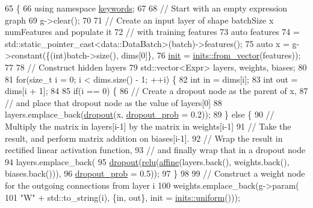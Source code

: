 \begin{DoxyCode}
65                                                      \{
66     \textcolor{keyword}{using namespace }\hyperlink{namespacekeywords}{keywords};
67 
68     \textcolor{comment}{// Start with an empty expression graph}
69     g->clear();
70 
71     \textcolor{comment}{// Create an input layer of shape batchSize x numFeatures and populate it}
72     \textcolor{comment}{// with training features}
73     \textcolor{keyword}{auto} features
74         = std::static\_pointer\_cast<data::DataBatch>(batch)->features();
75     \textcolor{keyword}{auto} x = g->constant(\{(int)batch->size(), dims[0]\},
76                          \hyperlink{amunmt_8cpp_a2e8ddb8bd2f3405f554c9f2c52277f4b}{init} = \hyperlink{namespacemarian_1_1inits_ab9566318ddbacd376c74cdbdfac091e4}{inits::from\_vector}(features));
77 
78     \textcolor{comment}{// Construct hidden layers}
79     std::vector<Expr> layers, weights, biases;
80 
81     \textcolor{keywordflow}{for}(\textcolor{keywordtype}{size\_t} i = 0; i < dims.size() - 1; ++i) \{
82       \textcolor{keywordtype}{int} in = dims[i];
83       \textcolor{keywordtype}{int} out = dims[i + 1];
84 
85       \textcolor{keywordflow}{if}(i == 0) \{
86         \textcolor{comment}{// Create a dropout node as the parent of x,}
87         \textcolor{comment}{//   and place that dropout node as the value of layers[0]}
88         layers.emplace\_back(\hyperlink{namespacemarian_a268400392f22176821c7c4a36733b178}{dropout}(x, \hyperlink{namespacemarian_1_1keywords_aeb1a41f81a79487b23aa2f8769a205bf}{dropout\_prob} = 0.2));
89       \} \textcolor{keywordflow}{else} \{
90         \textcolor{comment}{// Multiply the matrix in layers[i-1] by the matrix in weights[i-1]}
91         \textcolor{comment}{// Take the result, and perform matrix addition on biases[i-1].}
92         \textcolor{comment}{// Wrap the result in rectified linear activation function,}
93         \textcolor{comment}{// and finally wrap that in a dropout node}
94         layers.emplace\_back(
95             \hyperlink{namespacemarian_a268400392f22176821c7c4a36733b178}{dropout}(\hyperlink{namespacemarian_a6228f7e46aeed337e3886df6446b7840}{relu}(\hyperlink{namespacemarian_aefe65d738dc9a0536f3a1f9346b8d47b}{affine}(layers.back(), weights.back(), biases.back())),
96                     \hyperlink{namespacemarian_1_1keywords_aeb1a41f81a79487b23aa2f8769a205bf}{dropout\_prob} = 0.5));
97       \}
98 
99       \textcolor{comment}{// Construct a weight node for the outgoing connections from layer i}
100       weights.emplace\_back(g->param(
101           \textcolor{stringliteral}{"W"} + std::to\_string(i), \{in, out\}, init = \hyperlink{namespacemarian_1_1inits_a835dcbebcc1ee135e5637b2225eaf9d1}{inits::uniform}()));

\end{DoxyCode}
